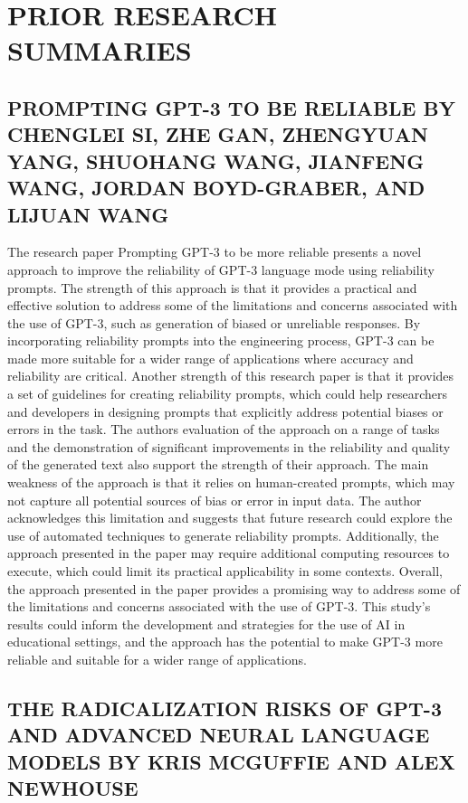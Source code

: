\documentclass[letterpaper, 10 pt, conference]{ieeeconf}  %
\begin{document}
\section{PRIOR RESEARCH SUMMARIES}

\subsection{PROMPTING GPT-3 TO BE RELIABLE BY CHENGLEI SI, ZHE GAN, ZHENGYUAN YANG, SHUOHANG WANG,
JIANFENG WANG, JORDAN BOYD-GRABER, AND LIJUAN WANG }

The research paper Prompting GPT-3 to be more reliable presents a novel approach to improve the reliability of GPT-3
language mode using reliability prompts. The strength of this approach is that it provides a practical and effective solution to
address some of the limitations and concerns associated with the use of GPT-3, such as generation of biased or unreliable responses.
By incorporating reliability prompts into the engineering process, GPT-3 can be made more suitable for a wider range of
applications where accuracy and reliability are critical.
Another strength of this research paper is that it provides a set of guidelines for creating reliability prompts, which could
help researchers and developers in designing prompts that explicitly address potential biases or errors in the task. The authors
evaluation of the approach on a range of tasks and the demonstration of significant improvements in the reliability and quality of
the generated text also support the strength of their approach.
The main weakness of the approach is that it relies on human-created prompts, which may not capture all potential sources
of bias or error in input data. The author acknowledges this limitation and suggests that future research could explore the use of
automated techniques to generate reliability prompts. Additionally, the approach presented in the paper may require additional
computing resources to execute, which could limit its practical applicability in some contexts.
Overall, the approach presented in the paper provides a promising way to address some of the limitations and concerns
associated with the use of GPT-3. This study’s results could inform the development and strategies for the use of AI in educational
settings, and the approach has the potential to make GPT-3 more reliable and suitable for a wider range of applications.


\subsection{THE RADICALIZATION RISKS OF GPT-3 AND ADVANCED NEURAL LANGUAGE MODELS BY KRIS MCGUFFIE
AND ALEX NEWHOUSE}
\end{document}
